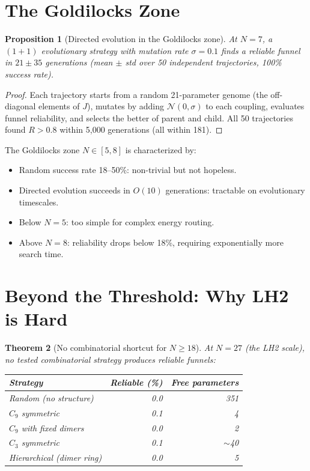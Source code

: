 \documentclass[11pt]{amsart}
\newtheorem{theorem}{Theorem}[section]
\newtheorem{proposition}[theorem]{Proposition}
\theoremstyle{definition}
\begin{document}
\section{The Goldilocks Zone}

\begin{proposition}[Directed evolution in the Goldilocks zone]
At $N = 7$, a $(1+1)$ evolutionary strategy with mutation rate $\sigma = 0.1$ finds a reliable funnel in $21 \pm 35$ generations (mean $\pm$ std over 50 independent trajectories, 100\% success rate).
\end{proposition}

\begin{proof}
Each trajectory starts from a random 21-parameter genome (the off-diagonal elements of $J$), mutates by adding $\mathcal{N}(0, \sigma)$ to each coupling, evaluates funnel reliability, and selects the better of parent and child. All 50 trajectories found $R > 0.8$ within 5{,}000 generations (all within 181).
\end{proof}

The Goldilocks zone $N \in [5, 8]$ is characterized by:
\begin{itemize}
\item Random success rate 18--50\%: non-trivial but not hopeless.
\item Directed evolution succeeds in $O(10)$ generations: tractable on evolutionary timescales.
\item Below $N = 5$: too simple for complex energy routing.
\item Above $N = 8$: reliability drops below 18\%, requiring exponentially more search time.
\end{itemize}

\section{Beyond the Threshold: Why LH2 is Hard}

\begin{theorem}[No combinatorial shortcut for $N \geq 18$]
At $N = 27$ (the LH2 scale), no tested combinatorial strategy produces reliable funnels:
\begin{center}
\begin{tabular}{l r r}
\toprule
Strategy & Reliable (\%) & Free parameters \\
\midrule
Random (no structure) & 0.0 & 351 \\
$C_9$ symmetric & 0.1 & 4 \\
$C_9$ with fixed dimers & 0.0 & 2 \\
$C_3$ symmetric & 0.1 & $\sim$40 \\
Hierarchical (dimer ring) & 0.0 & 5 \\
\bottomrule
\end{tabular}
\end{center}
\end{theorem}
\end{document}
